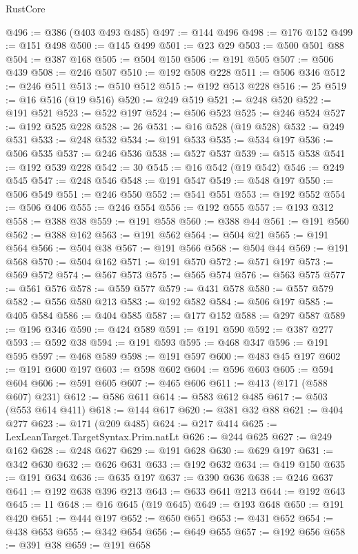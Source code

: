 \begin{lexlean}{RustCore}
\begin{coremodule}
@496 := @386 (@403 @493 @485)
@497 := @144 @496
@498 := @176 @152
@499 := @151 @498
@500 := @145 @499
@501 := @23 @29
@503 := @500 @501 @88
@504 := @387 @168
@505 := @504 @150
@506 := @191 @505
@507 := @506 @439
@508 := @246 @507
@510 := @192 @508 @228
@511 := @506 @346
@512 := @246 @511
@513 := @510 @512
@515 := @192 @513 @228
@516 := 25
@519 := @16 @516 (@19 @516)
@520 := @249 @519
@521 := @248 @520
@522 := @191 @521
@523 := @522 @197
@524 := @506 @523
@525 := @246 @524
@527 := @192 @525 @228
@528 := 26
@531 := @16 @528 (@19 @528)
@532 := @249 @531
@533 := @248 @532
@534 := @191 @533
@535 := @534 @197
@536 := @506 @535
@537 := @246 @536
@538 := @527 @537
@539 := @515 @538
@541 := @192 @539 @228
@542 := 30
@545 := @16 @542 (@19 @542)
@546 := @249 @545
@547 := @248 @546
@548 := @191 @547
@549 := @548 @197
@550 := @506 @549
@551 := @246 @550
@552 := @541 @551
@553 := @192 @552
@554 := @506 @406
@555 := @246 @554
@556 := @192 @555
@557 := @193 @312
@558 := @388 @38
@559 := @191 @558
@560 := @388 @44
@561 := @191 @560
@562 := @388 @162
@563 := @191 @562
@564 := @504 @21
@565 := @191 @564
@566 := @504 @38
@567 := @191 @566
@568 := @504 @44
@569 := @191 @568
@570 := @504 @162
@571 := @191 @570
@572 := @571 @197
@573 := @569 @572
@574 := @567 @573
@575 := @565 @574
@576 := @563 @575
@577 := @561 @576
@578 := @559 @577
@579 := @431 @578
@580 := @557 @579
@582 := @556 @580 @213
@583 := @192 @582
@584 := @506 @197
@585 := @405 @584
@586 := @404 @585
@587 := @177 @152
@588 := @297 @587
@589 := @196 @346
@590 := @424 @589
@591 := @191 @590
@592 := @387 @277
@593 := @592 @38
@594 := @191 @593
@595 := @468 @347
@596 := @191 @595
@597 := @468 @589
@598 := @191 @597
@600 := @483 @45 @197
@602 := @191 @600 @197
@603 := @598 @602
@604 := @596 @603
@605 := @594 @604
@606 := @591 @605
@607 := @465 @606
@611 := @413 (@171 (@588 @607) @231)
@612 := @586 @611
@614 := @583 @612 @485
@617 := @503 (@553 @614 @411)
@618 := @144 @617
@620 := @381 @32 @88
@621 := @404 @277
@623 := @171 (@209 @485)
@624 := @217 @414
@625 := LexLeanTarget.TargetSyntax.Prim.natLt
@626 := @244 @625
@627 := @249 @162
@628 := @248 @627
@629 := @191 @628
@630 := @629 @197
@631 := @342 @630
@632 := @626 @631
@633 := @192 @632
@634 := @419 @150
@635 := @191 @634
@636 := @635 @197
@637 := @390 @636
@638 := @246 @637
@641 := @192 @638 @396 @213
@643 := @633 @641 @213
@644 := @192 @643
@645 := 11
@648 := @16 @645 (@19 @645)
@649 := @193 @648
@650 := @191 @420
@651 := @444 @197
@652 := @650 @651
@653 := @431 @652
@654 := @438 @653
@655 := @342 @654
@656 := @649 @655
@657 := @192 @656
@658 := @391 @38
@659 := @191 @658

\end{coremodule}
\end{lexlean}
